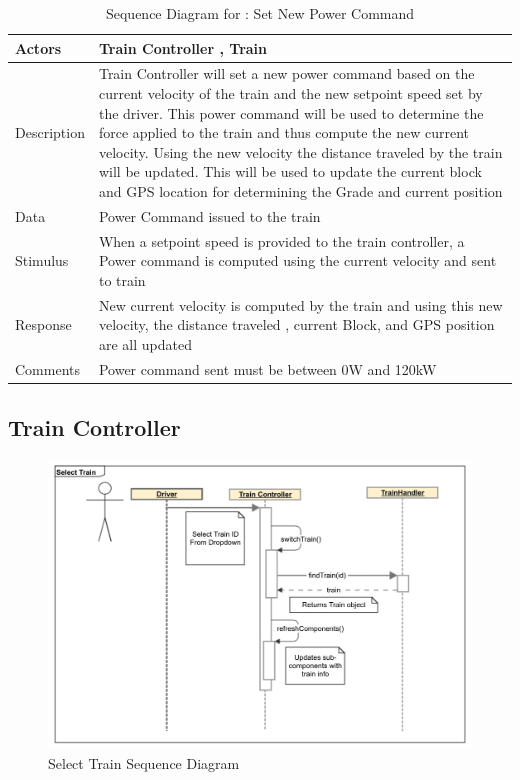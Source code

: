 \documentclass[]{article}
\begin{document}
\begin{table}[H]
	\centering
	\caption{Sequence Diagram for : Set New Power Command}
	\begin{tabular}{|l|l|}
		\hline
		Actors & \parbox[t]{10cm}{Train Controller , Train} \\ \hline
		Description & \parbox[t]{10cm}{Train Controller will set a new power command based on the current velocity of the train and the new setpoint speed set by the driver. This power command will be used to determine the force applied to the train and thus compute the new current velocity. Using the new velocity the distance traveled by the train will be updated. This will be used to update the current block and GPS location for determining the Grade and current position} \\ \hline
		Data &  \parbox[t]{10cm}{Power Command issued to the train} \\ \hline
		Stimulus &  \parbox[t]{10cm}{When a setpoint speed is provided to the train controller, a Power command is computed using the current velocity and sent to train} \\ \hline
		Response & \parbox[t]{10cm}{New current velocity is computed by the train and using this new velocity, the distance traveled , current Block, and GPS position are all updated }\\ \hline
		Comments & \parbox[t]{10cm}{Power command sent must be between 0W and 120kW}  \\ \hline
	\end{tabular}
\end{table}

\subsection{Train Controller}

\begin{figure}[H]
	\centering
	\includegraphics[width=\textwidth]{tc_selectTrain_usecase}
	\caption{Select Train Sequence Diagram}
\end{figure}
\end{document}

